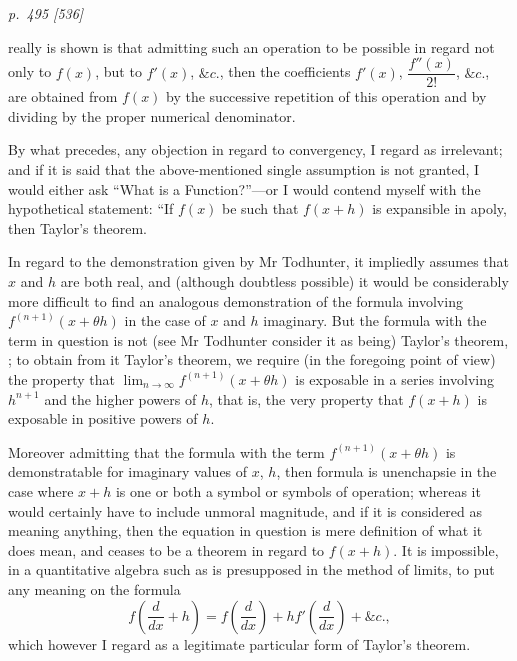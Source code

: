 \documentclass[11pt,a4paper]{book}
\begin{document}
\clearpage

\bigskip
\textit{p.~495 [536]}
\smallskip

\noindent
really is shown is that admitting such an operation to be possible in regard not only
to $f(x)$, but to $f'(x)$, $\&c.$, then the coefficients $f'(x)$, $\dfrac{f''(x)}{2!}$, $\&c.$, are obtained from $f(x)$
by the successive repetition of this operation and by dividing by the proper numerical
denominator.

By what precedes, any objection in regard to convergency, I regard as irrelevant;
and if it is said that the above-mentioned single assumption is not granted, I would
either ask ``What is a Function?''---or I would contend myself with the hypothetical
statement: ``If $f(x)$ be such that $f(x + h)$ is expansible in apoly, then Taylor's theorem.

In regard to the demonstration given by Mr Todhunter, it impliedly assumes that
$x$ and $h$ are both real, and (although doubtless possible) it would be considerably
more difficult to find an analogous demonstration of the formula involving $f^{(n+1)}(x + \theta h)$
in the case of $x$ and $h$ imaginary. But the formula with the term in question is
not (see Mr Todhunter consider it as being) Taylor's theorem, ; to obtain from it Taylor's
theorem, we require (in the foregoing point of view) the property that $\lim_{n \to \infty} f^{(n+1)}(x + \theta h)$ is
exposable in a series involving $h^{n+1}$ and the higher powers of $h$, that is, the very
property that $f(x + h)$ is exposable in positive powers of $h$.

Moreover admitting that the formula with the term $f^{(n+1)}(x + \theta h)$ is demonstratable
for imaginary values of $x$, $h$, then formula is unenchapsie in the case where $x + h$ is
one or both a symbol or symbols of operation; whereas it would certainly have to include
unmoral magnitude, and if it is considered as meaning anything, then the equation
in question is mere definition of what it does mean, and ceases to be a theorem
in regard to $f(x + h)$. It is impossible, in a quantitative algebra such as is presupposed
in the method of limits, to put any meaning on the formula
\[
f\left(\frac{d}{dx} + h\right) = f\left(\frac{d}{dx}\right) + hf'\left(\frac{d}{dx}\right) + \&c.,
\]
which however I regard as a legitimate particular form of Taylor's theorem.

\clearpage

\end{document}
